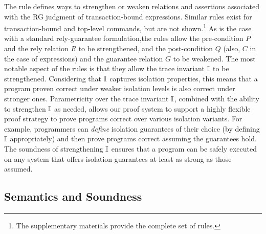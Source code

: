 
The  rule defines ways to strengthen or
weaken relations and assertions associated with the RG judgment of
transaction-bound expressions. Similar rules exist for
transaction-bound and top-level commands, but are not
shown.\footnote{The supplementary materials provide the complete set
  of rules.} As is the case with a standard rely-guarantee
formulation,the rules allow the pre-condition $P$ and the rely relation
$R$ to be strengthened, and the post-condition $Q$ (also, $C$ in the
case of expressions) and the guarantee relation $G$ to be weakened.
The most notable aspect of the  rules is that
they allow the trace invariant $\mathbb{I}$ to be strengthened. Considering
that $\mathbb{I}$ captures isolation properties, this means that a program
proven correct under weaker isolation levels is also correct under
stronger ones.  Parametricity over the trace invariant $\mathbb{I}$, combined
with the ability to strengthen $\mathbb{I}$ as needed, allows our proof system
to support a highly flexible proof strategy to prove programs correct
over various isolation variants. For example, programmers can
\emph{define} isolation guarantees of their choice (by defining $\mathbb{I}$
appropriately) and then prove programs correct assuming the guarantees
hold.  The soundness of strengthening $\mathbb{I}$ ensures that a program can
be safely executed on any system that offers isolation guarantees
at least as strong as those assumed.

\subsection{Semantics and Soundness}

